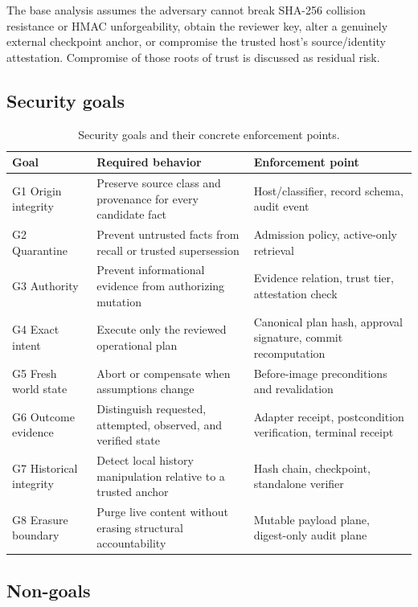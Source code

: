 The base analysis assumes the adversary cannot break SHA-256 collision resistance or HMAC unforgeability, obtain the reviewer key, alter a genuinely external checkpoint anchor, or compromise the trusted host's source/identity attestation. Compromise of those roots of trust is discussed as residual risk.

\subsection{Security goals}

\begin{table}[t]
\centering
\caption{Security goals and their concrete enforcement points.}
\label{tab:goals}
\scriptsize
\begin{tabularx}{\columnwidth}{@{}p{19mm}YY@{}}
\toprule
Goal & Required behavior & Enforcement point \\
\midrule
G1 Origin integrity & Preserve source class and provenance for every candidate fact & Host/classifier, record schema, audit event \\
G2 Quarantine & Prevent untrusted facts from recall or trusted supersession & Admission policy, active-only retrieval \\
G3 Authority & Prevent informational evidence from authorizing mutation & Evidence relation, trust tier, attestation check \\
G4 Exact intent & Execute only the reviewed operational plan & Canonical plan hash, approval signature, commit recomputation \\
G5 Fresh world state & Abort or compensate when assumptions change & Before-image preconditions and revalidation \\
G6 Outcome evidence & Distinguish requested, attempted, observed, and verified state & Adapter receipt, postcondition verification, terminal receipt \\
G7 Historical integrity & Detect local history manipulation relative to a trusted anchor & Hash chain, checkpoint, standalone verifier \\
G8 Erasure boundary & Purge live content without erasing structural accountability & Mutable payload plane, digest-only audit plane \\
\bottomrule
\end{tabularx}
\end{table}

\subsection{Non-goals}

